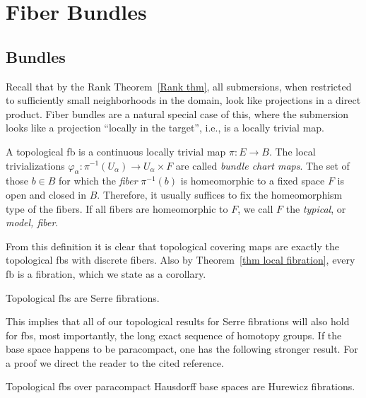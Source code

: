 
\chapter{Fiber Bundles}\label{chap: Fiber bundles}

\section{Bundles}

Recall that by the Rank Theorem~\ref{Rank thm}, all submersions, when restricted to sufficiently small neighborhoods in the domain, look like projections in a direct product. Fiber bundles are a natural special case of this, where the submersion looks like a projection ``locally in the target'', i.e., is a locally trivial map. 

\begin{defn}
    A topological \gls{fb} is a continuous locally trivial map $\pi:E\to B$. The local trivializations $\varphi_\alpha:\pi^{-1}(U_\alpha)\to U_\alpha\times F$ are called \emph{bundle chart maps}. The set of those $b\in B$ for which the \emph{fiber} $\pi^{-1}(b)$ is homeomorphic to a fixed space $F$ is open and closed in $B$. Therefore, it usually suffices to fix the homeomorphism type of the fibers. If all fibers are homeomorphic to $F$, we call $F$ the \emph{typical}, or \emph{model, fiber}.
\end{defn}

From this definition it is clear that topological covering maps are exactly the topological \glspl{fb} with discrete fibers. Also by Theorem~\ref{thm local fibration}, every \gls{fb} is a fibration, which we state as a corollary. 

\begin{cor}[{{\cite[Cor.~3.2.5]{RS2}}}]
    Topological \glspl{fb} are Serre fibrations.
\end{cor}

This implies that all of our topological results for Serre fibrations will also hold for \glspl{fb}, most importantly, the long exact sequence of homotopy groups. If the base space happens to be paracompact, one has the following stronger result. For a proof we direct the reader to the cited reference.

\begin{cor}
    Topological \glspl{fb} over paracompact Hausdorff base spaces are Hurewicz fibrations.
\end{cor}

